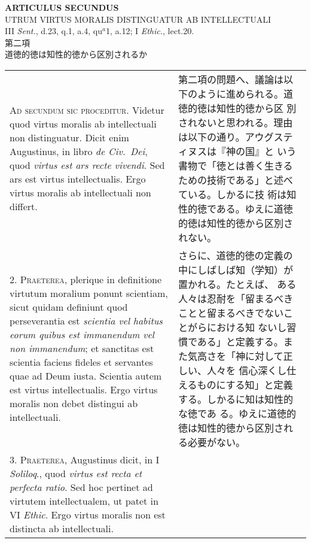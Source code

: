 \documentclass[10pt]{jsarticle}
\begin{document}
\begin{center}
{\Large {\bf ARTICULUS SECUNDUS}}\\
{\large UTRUM VIRTUS MORALIS DISTINGUATUR AB INTELLECTUALI}\\
{\footnotesize III {\itshape Sent.}, d.23, q.1, a.4, qu$^{a}$1, a.12; I {\itshape Ethic.}, lect.20.}\\
{\Large 第二項\\道徳的徳は知性的徳から区別されるか}
\end{center}

\begin{longtable}{p{21em}p{21em}}
{\scshape Ad secundum sic proceditur}. Videtur quod virtus moralis ab
intellectuali non distinguatur. Dicit enim Augustinus, in libro
{\itshape de Civ.~Dei}, quod {\itshape virtus est ars recte
vivendi}. Sed ars est virtus intellectualis. Ergo virtus moralis ab
intellectuali non differt.

&

第二項の問題へ、議論は以下のように進められる。道徳的徳は知性的徳から区
別されないと思われる。理由は以下の通り。アウグスティヌスは『神の国』と
いう書物で「徳とは善く生きるための技術である」と述べている。しかるに技
術は知性的徳である。ゆえに道徳的徳は知性的徳から区別されない。

\\


2. {\scshape Praeterea}, plerique in definitione virtutum moralium ponunt
scientiam, sicut quidam definiunt quod perseverantia est {\itshape scientia vel
habitus eorum quibus est immanendum vel non immanendum}; et sanctitas
est scientia faciens fideles et servantes quae ad Deum iusta. Scientia
autem est virtus intellectualis. Ergo virtus moralis non debet
distingui ab intellectuali.

&

 さらに、道徳的徳の定義の中にしばしば知（学知）が置かれる。たとえば、
 ある人々は忍耐を「留まるべきことと留まるべきでないことがらにおける知
 ないし習慣である」と定義する。また気高さを「神に対して正しい、人々を
 信心深くし仕えるものにする知」と定義する。しかるに知は知性的な徳であ
 る。ゆえに道徳的徳は知性的徳から区別される必要がない。

 
\\



3. {\scshape Praeterea}, Augustinus dicit, in I {\itshape Soliloq}.,
quod {\itshape virtus est recta et perfecta ratio}. Sed hoc pertinet
ad virtutem intellectualem, ut patet in VI {\itshape Ethic}. Ergo
virtus moralis non est distincta ab intellectuali.


\end{longtable}
\end{document}
